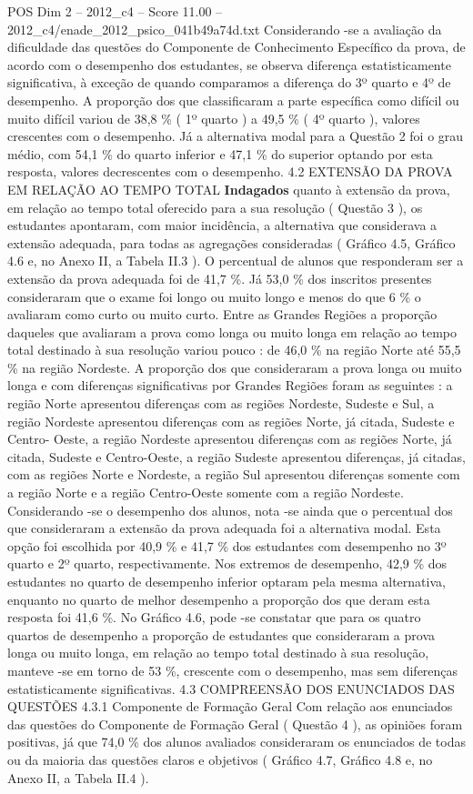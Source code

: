 \begin{textsample}{POS Dim 2 – 2012\_c4 – Score 11.00 – 2012\_c4/enade\_2012\_psico\_041b49a74d.txt}
Considerando -se a avaliação da dificuldade das questões do Componente de Conhecimento Específico da prova, de acordo com o desempenho dos estudantes, se observa diferença estatisticamente significativa, à exceção de quando comparamos a diferença do 3º quarto e 4º de desempenho.
A proporção dos que classificaram a parte específica como difícil ou muito difícil variou de 38,8 \% ( 1º quarto ) a 49,5 \% ( 4º quarto ), valores crescentes com o desempenho.
Já a alternativa modal para a Questão 2 foi o grau médio, com 54,1 \% do quarto inferior e 47,1 \% do superior optando por esta resposta, valores decrescentes com o desempenho. 4.2 EXTENSÃO DA PROVA EM RELAÇÃO AO TEMPO TOTAL \textbf{Indagados} quanto à extensão da prova, em relação ao tempo total oferecido para a sua resolução ( Questão 3 ), os estudantes apontaram, com maior incidência, a alternativa que considerava a extensão adequada, para todas as agregações consideradas ( Gráfico 4.5, Gráfico 4.6 e, no Anexo II, a Tabela II.3 ).
O percentual de alunos que responderam ser a extensão da prova adequada foi de 41,7 \%.
Já 53,0 \% dos inscritos presentes consideraram que o exame foi longo ou muito longo e menos do que 6 \% o avaliaram como curto ou muito curto.
Entre as Grandes Regiões a proporção daqueles que avaliaram a prova como longa ou muito longa em relação ao tempo total destinado à sua resolução variou pouco : de 46,0 \% na região Norte até 55,5 \% na região Nordeste.
A proporção dos que consideraram a prova longa ou muito longa e com diferenças significativas por Grandes Regiões foram as seguintes : a região Norte apresentou diferenças com as regiões Nordeste, Sudeste e Sul, a região Nordeste apresentou diferenças com as regiões Norte, já citada, Sudeste e Centro- Oeste, a região Nordeste apresentou diferenças com as regiões Norte, já citada, Sudeste e Centro-Oeste, a região Sudeste apresentou diferenças, já citadas, com as regiões Norte e Nordeste, a região Sul apresentou diferenças somente com a região Norte e a região Centro-Oeste somente com a região Nordeste.
Considerando -se o desempenho dos alunos, nota -se ainda que o percentual dos que consideraram a extensão da prova adequada foi a alternativa modal.
Esta opção foi escolhida por 40,9 \% e 41,7 \% dos estudantes com desempenho no 3º quarto e 2º quarto, respectivamente.
Nos extremos de desempenho, 42,9 \% dos estudantes no quarto de desempenho inferior optaram pela mesma alternativa, enquanto no quarto de melhor desempenho a proporção dos que deram esta resposta foi 41,6 \%.
No Gráfico 4.6, pode -se constatar que para os quatro quartos de desempenho a proporção de estudantes que consideraram a prova longa ou muito longa, em relação ao tempo total destinado à sua resolução, manteve -se em torno de 53 \%, crescente com o desempenho, mas sem diferenças estatisticamente significativas. 4.3 COMPREENSÃO DOS ENUNCIADOS DAS QUESTÕES 4.3.1 Componente de Formação Geral Com relação aos enunciados das questões do Componente de Formação Geral ( Questão 4 ), as opiniões foram positivas, já que 74,0 \% dos alunos avaliados consideraram os enunciados de todas ou da maioria das questões claros e objetivos ( Gráfico 4.7, Gráfico 4.8 e, no Anexo II, a Tabela II.4 ).

\end{textsample}
